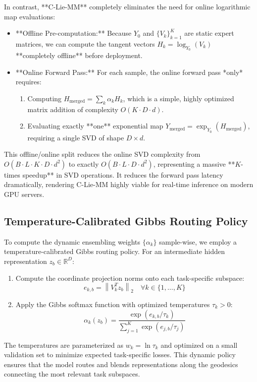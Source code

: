In contrast, **C-Lie-MM** completely eliminates the need for online logarithmic map evaluations:
\begin{itemize}
    \item **Offline Pre-computation:** Because $Y_0$ and $\{V_k\}_{k=1}^K$ are static expert matrices, we can compute the tangent vectors $H_k = \log_{Y_0}(V_k)$ **completely offline** before deployment.
    \item **Online Forward Pass:** For each sample, the online forward pass *only* requires:
    \begin{enumerate}
        \item Computing $H_{\text{merged}} = \sum_k \alpha_k H_k$, which is a simple, highly optimized matrix addition of complexity $O(K \cdot D \cdot d)$.
        \item Evaluating exactly **one** exponential map $Y_{\text{merged}} = \exp_{Y_0}(H_{\text{merged}})$, requiring a single SVD of shape $D \times d$.
    \end{enumerate}
\end{itemize}

This offline/online split reduces the online SVD complexity from $O(B \cdot L \cdot K \cdot D \cdot d^2)$ to exactly $O(B \cdot L \cdot D \cdot d^2)$, representing a massive **$K$-times speedup** in SVD operations. It reduces the forward pass latency dramatically, rendering C-Lie-MM highly viable for real-time inference on modern GPU servers.

\subsection{Temperature-Calibrated Gibbs Routing Policy}
To compute the dynamic ensembling weights $\{\alpha_k\}$ sample-wise, we employ a temperature-calibrated Gibbs routing policy. For an intermediate hidden representation $z_b \in \mathbb{R}^D$:
\begin{enumerate}
    \item Compute the coordinate projection norms onto each task-specific subspace:
    \begin{equation}
        e_{k,b} = \left\|V_k^T z_b\right\|_2 \quad \forall k \in \{1, \dots, K\}
    \end{equation}
    \item Apply the Gibbs softmax function with optimized temperatures $\tau_k > 0$:
    \begin{equation}
        \alpha_k(z_b) = \frac{\exp\left(e_{k,b} / \tau_k\right)}{\sum_{j=1}^K \exp\left(e_{j,b} / \tau_j\right)}
    \end{equation}
\end{enumerate}
The temperatures are parameterized as $w_k = \ln \tau_k$ and optimized on a small validation set to minimize expected task-specific losses. This dynamic policy ensures that the model routes and blends representations along the geodesics connecting the most relevant task subspaces.

